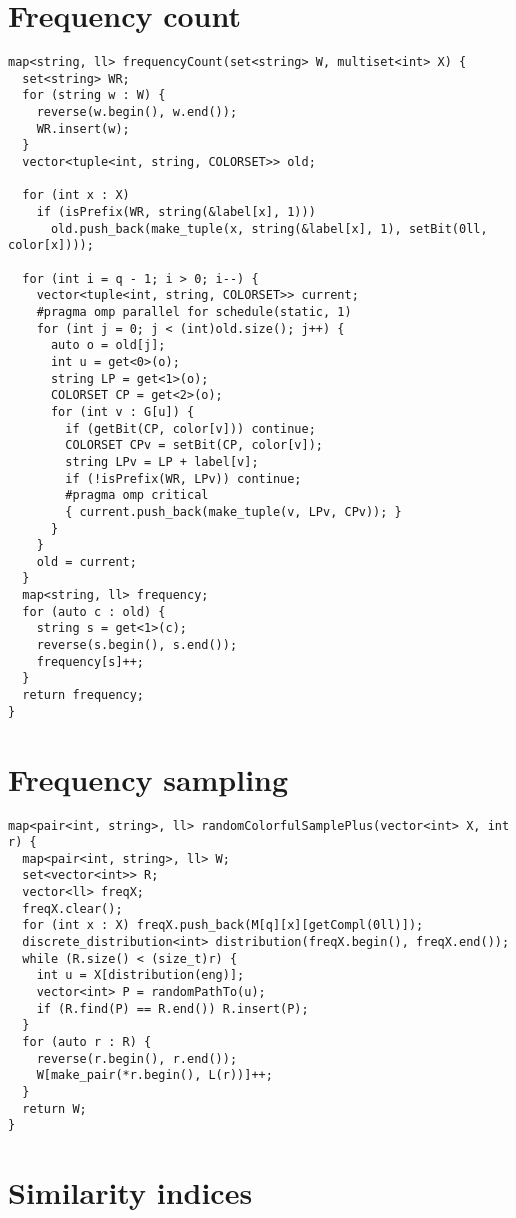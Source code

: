 \clearpage
\section{Frequency count}

\begin{lstlisting}
map<string, ll> frequencyCount(set<string> W, multiset<int> X) {
  set<string> WR;
  for (string w : W) {
    reverse(w.begin(), w.end());
    WR.insert(w);
  }
  vector<tuple<int, string, COLORSET>> old;

  for (int x : X)
    if (isPrefix(WR, string(&label[x], 1)))
      old.push_back(make_tuple(x, string(&label[x], 1), setBit(0ll, color[x])));

  for (int i = q - 1; i > 0; i--) {
    vector<tuple<int, string, COLORSET>> current;
    #pragma omp parallel for schedule(static, 1)
    for (int j = 0; j < (int)old.size(); j++) {
      auto o = old[j];
      int u = get<0>(o);
      string LP = get<1>(o);
      COLORSET CP = get<2>(o);
      for (int v : G[u]) {
        if (getBit(CP, color[v])) continue;
        COLORSET CPv = setBit(CP, color[v]);
        string LPv = LP + label[v];
        if (!isPrefix(WR, LPv)) continue;
        #pragma omp critical
        { current.push_back(make_tuple(v, LPv, CPv)); }
      }
    }
    old = current;
  }
  map<string, ll> frequency;
  for (auto c : old) {
    string s = get<1>(c);
    reverse(s.begin(), s.end());
    frequency[s]++;
  }
  return frequency;
}

\end{lstlisting}

\clearpage
\section{Frequency sampling}

\begin{lstlisting}
map<pair<int, string>, ll> randomColorfulSamplePlus(vector<int> X, int r) {
  map<pair<int, string>, ll> W;
  set<vector<int>> R;
  vector<ll> freqX;
  freqX.clear();
  for (int x : X) freqX.push_back(M[q][x][getCompl(0ll)]);
  discrete_distribution<int> distribution(freqX.begin(), freqX.end());
  while (R.size() < (size_t)r) {
    int u = X[distribution(eng)];
    vector<int> P = randomPathTo(u);
    if (R.find(P) == R.end()) R.insert(P);
  }
  for (auto r : R) {
    reverse(r.begin(), r.end());
    W[make_pair(*r.begin(), L(r))]++;
  }
  return W;
}
\end{lstlisting}

\clearpage
\section{Similarity indices}

